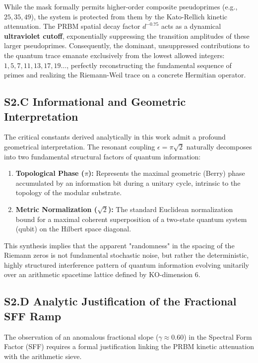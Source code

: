 \documentclass[aps,prl,preprint,superscriptaddress,floatfix]{revtex4-2}
\begin{document}
While the mask formally permits higher-order composite pseudoprimes (e.g., $25, 35, 49$), the system is protected from them by the Kato-Rellich kinetic attenuation. The PRBM spatial decay factor $d^{-0.75}$ acts as a dynamical \textbf{ultraviolet cutoff}, exponentially suppressing the transition amplitudes of these larger pseudoprimes. Consequently, the dominant, unsuppressed contributions to the quantum trace emanate exclusively from the lowest allowed integers: $1, 5, 7, 11, 13, 17, 19\dots$, perfectly reconstructing the fundamental sequence of primes and realizing the Riemann-Weil trace on a concrete Hermitian operator.

\subsection{S2.C Informational and Geometric Interpretation}

The critical constants derived analytically in this work admit a profound geometrical interpretation. The resonant coupling $\epsilon = \pi\sqrt{2}$ naturally decomposes into two fundamental structural factors of quantum information:
\begin{enumerate}
    \item \textbf{Topological Phase ($\pi$):} Represents the maximal geometric (Berry) phase accumulated by an information bit during a unitary cycle, intrinsic to the topology of the modular substrate.
    \item \textbf{Metric Normalization ($\sqrt{2}$):} The standard Euclidean normalization bound for a maximal coherent superposition of a two-state quantum system (qubit) on the Hilbert space diagonal.
\end{enumerate}
This synthesis implies that the apparent "randomness" in the spacing of the Riemann zeros is not fundamental stochastic noise, but rather the deterministic, highly structured interference pattern of quantum information evolving unitarily over an arithmetic spacetime lattice defined by KO-dimension 6.

\subsection{S2.D Analytic Justification of the Fractional SFF Ramp}

The observation of an anomalous fractional slope ($\gamma \approx 0.60$) in the Spectral Form Factor (SFF) requires a formal justification linking the PRBM kinetic attenuation with the arithmetic sieve. 
\end{document}
